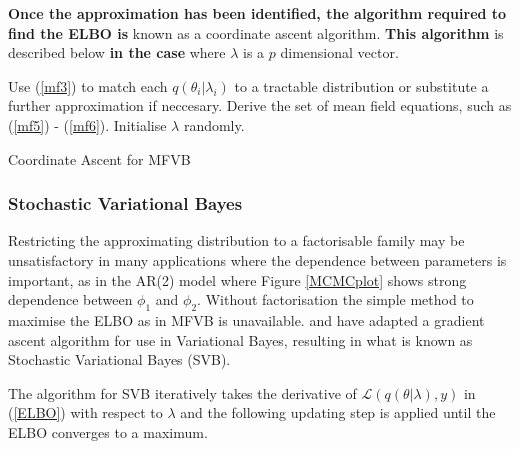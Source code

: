 \documentclass[12pt,a4paper]{article}%
\numberwithin{equation}{section}
\begin{document}
\vspace{5mm}

{\bf Once the approximation has been identified, the algorithm required to find the ELBO is} known as a coordinate ascent algorithm. %
{\bf This algorithm} is described below {\bf in the case} where $\lambda$ is a $p$ dimensional vector. %

\vspace{2mm}

\begin{algorithm}[H]
 Use (\ref{mf3}) to match each $q(\theta_i|\lambda_i)$ to a tractable distribution or substitute a further approximation if neccesary.\;
 Derive the set of mean field equations, such as (\ref{mf5}) - (\ref{mf6}).\;
 Initialise $\lambda$ randomly. \;
 \caption{Coordinate Ascent for MFVB}
  \label{alg:algorithm1}
\end{algorithm}

\subsubsection{Stochastic Variational Bayes}



Restricting the approximating distribution to a factorisable family may be unsatisfactory in many applications where the dependence between parameters is important, as in the AR(2) model where Figure \ref{MCMCplot} shows strong dependence between $\phi_1$ and $\phi_2$. Without factorisation the simple method to maximise the ELBO as in MFVB is unavailable. \citet{Paisley2012} and \citet{Ranganath2014} have adapted a gradient ascent algorithm for use in Variational Bayes, resulting in what is known as Stochastic Variational Bayes (SVB).

The algorithm for SVB iteratively takes the  derivative of $\mathcal{L}(q(\theta | \lambda), y)$ in (\ref{ELBO}) with respect to $\lambda$ and the following updating step is applied until the ELBO converges to a maximum.
\end{document}
